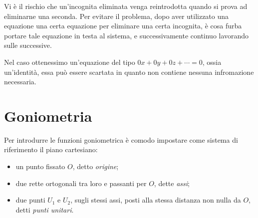 \documentclass[a4paper]{article}
\begin{document}
Vi è il rischio che un'incognita eliminata venga reintrodotta quando si prova ad eliminarne una seconda.
Per evitare il problema, dopo aver utilizzato una equazione una certa equazione per eliminare una certa incognita,
è cosa furba portare tale equazione in testa al sistema, e successivamente continuo
lavorando sulle successive.


Nel caso ottenessimo un'equazione del tipo \(0x + 0y + 0z + \cdots = 0\), ossia un'identità,
essa può essere scartata in quanto non contiene nessuna infromazione necessaria.

\pagebreak

\section{Goniometria}

Per introdurre le funzioni goniometrica è comodo impostare come sistema di riferimento
il piano cartesiano:
\begin{itemize}
    \item un punto fissato \(O\), detto \textit{origine};
    \item due rette ortogonali tra loro e passanti per \(O\), dette \textit{assi};
    \item due punti \(U_1\) e \(U_2\), sugli stessi assi, posti alla stessa distanza non nulla da \(O\),
    detti \textit{punti unitari}.
\end{itemize}
\end{document}
